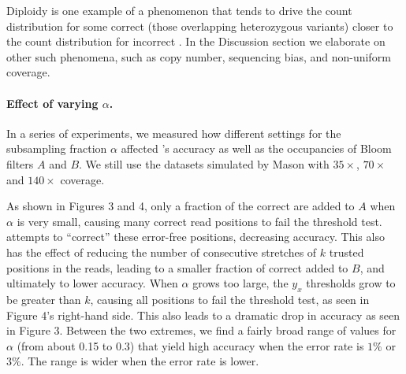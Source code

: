 \documentclass{bmcart}
\begin{document}
Diploidy is one example of a phenomenon that tends to drive the count distribution for some correct \kmers (those overlapping heterozygous variants) closer to the count distribution for incorrect \kmers.
In the Discussion section we elaborate on other such phenomena, such as copy number, sequencing bias, and non-uniform coverage.



\paragraph{Effect of varying $\alpha$.} In a series of experiments, we measured how different settings for the subsampling fraction $\alpha$ affected \tool's accuracy as well as the occupancies of Bloom filters $A$ and $B$.  We still use the datasets simulated by Mason with $35\times$, $70\times$ and $140\times$ coverage. 



As shown in Figures 3 and 4, only a fraction of the correct \kmers are added to $A$ when $\alpha$ is very small, causing many correct read positions to fail the threshold test.  \tool attempts to ``correct'' these error-free positions, decreasing accuracy.  This also has the effect of reducing the number of consecutive stretches of $k$ trusted positions in the reads, leading to a smaller fraction of correct \kmers added to $B$, and ultimately to lower accuracy.  When $\alpha$ grows too large, the $y_x$ thresholds grow to be greater than $k$, causing all positions to fail the threshold test, as seen in Figure 4's right-hand side.  This also leads to a dramatic drop in accuracy as seen in Figure 3.  Between the two extremes, we find a fairly broad range of values for $\alpha$ (from about 0.15 to 0.3) that yield high accuracy when the error rate is $1\%$ or $3\%$.  The range is wider when the error rate is lower.
\end{document}
